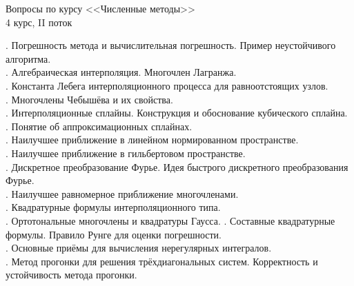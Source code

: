 \documentclass[specialist, subf, href, colorlinks=true, 14pt, times, mtpro, final]{disser}
\begin{document}
\begin{center}
    Вопросы по курсу <<Численные методы>> \\ 4 курс, II поток
\end{center}

. Погрешность метода и вычислительная погрешность. Пример неустойчивого алгоритма.\\
. Алгебраическая интерполяция. Многочлен Лагранжа.\\
. Константа Лебега интерполяционного процесса для равноотстоящих узлов.\\
. Многочлены Чебышёва и их свойства.\\
. Интерполяционные сплайны. Конструкция и обоснование кубического сплайна.\\
. Понятие об аппроксимационных сплайнах.\\
. Наилучшее приближение в линейном нормированном пространстве.\\
. Наилучшее приближение в гильбертовом пространстве.\\
. Дискретное преобразование Фурье. Идея быстрого дискретного преобразования Фурье.\\
. Наилучшее равномерное приближение многочленами.\\
. Квадратурные формулы интерполяционного типа.\\
. Ортотональные многочлены и квадратуры Гаусса.
. Составные квадратурные формулы. Правило Рунге для оценки погрешности.\\
. Основные приёмы для вычисления нерегулярных интегралов.\\
. Метод прогонки для решения трёхдиагональных систем. Корректность и устойчивость метода прогонки.\\
\end{document}
